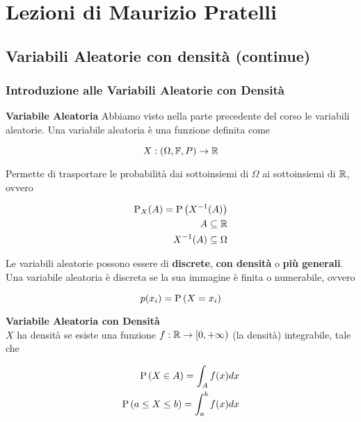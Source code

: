 \part{Lezioni di Maurizio Pratelli}

\chapter{Variabili Aleatorie con densità (continue)}

\section{Introduzione alle Variabili Aleatorie con Densità}

\begin{defn}
    \textbf{Variabile Aleatoria}
    Abbiamo visto nella parte precedente del corso le variabili aleatorie.
    Una variabile aleatoria è una funzione definita come


    \begin{equation*}
        X: (\Omega, \mathbb{F}, P) \to \mathbb{R}
    \end{equation*}

    Permette di trasportare le probabilità dai sottoinsiemi di $ \Omega $ ai sottoinsiemi di $ \mathbb{R} $, ovvero


    \begin{equation*}
        \begin{aligned}
            \text{P}_X(A) = \text{P}\left(X^{-1} (A)\right) \\
            A \subseteq \mathbb{R} \\
            X^{-1}(A) \subseteq \Omega
        \end{aligned}
    \end{equation*}

    Le variabili aleatorie possono essere di \textbf{discrete}, \textbf{con densità} o \textbf{più generali}.
    Una variabile aleatoria è discreta se la sua immagine è finita o numerabile, ovvero


    \begin{equation*}
        p(x_i) = \text{P}\left(X=x_i\right)
    \end{equation*}
\end{defn}


\begin{defn}
    \textbf{Variabile Aleatoria con Densità} \\
    $ X $ ha densità se esiste una funzione $ f : \mathbb{R} \to [0, +\infty) $ (la densità) integrabile, tale che

    \begin{equation*}
        \begin{aligned}
            \text{P}\left(X \in A\right) = \int_A f(x)dx \\
            \text{P}\left(a \leq X \leq b\right) = \int_a^b f(x)dx
        \end{aligned}
    \end{equation*}
\end{defn}

